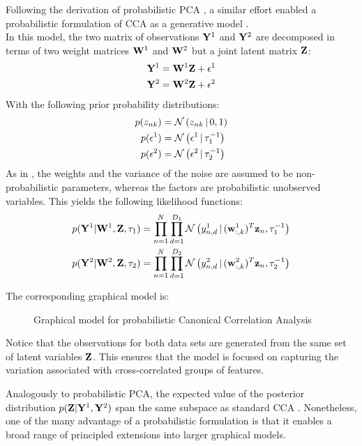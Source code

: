Following the derivation of probabilistic PCA \cite{Tipping1999}, a similar effort enabled a probabilistic formulation of CCA as a generative model \cite{Bach2005}.\\
In this model, the two matrix of observations ${\bf Y}^{1}$ and ${\bf Y}^{2}$ are decomposed in terms of two weight matrices ${\bf W}^{1}$ and ${\bf W}^{2}$ but a joint latent matrix ${\bf Z}$:
\begin{align*}
	{\bf Y}^{1} &= {\bf W}^{1} {\bf Z} + \epsilon^{1} \\
	{\bf Y}^{2} &= {\bf W}^{2} {\bf Z} + \epsilon^{2}
\end{align*}
With the following prior probability distributions:
\begin{align*}
	p(z_{nk}) &= \mathcal{N}\left(z_{nk} \,|\, 0,1\right) \\
	p(\epsilon^{1}) &= \mathcal{N}\left(\epsilon^{1} \,|\, \tau_{1}^{-1}\right) \\
	p(\epsilon^{2}) &= \mathcal{N}\left(\epsilon^{2} \,|\, \tau_{2}^{-1}\right)
\end{align*}
As in \cite{Tipping1999}, the weights and the variance of the noise are assumed to be non-probabilistic parameters, whereas the factors are probabilistic unobserved variables. This yields the following likelihood functions:
\begin{align} \label{eq:probabilistic_cca_likelihood}
	p({\bf Y}^{1}|{\bf W}^{1},{\bf Z},\tau_{1}) &= \prod_{n=1}^{N} \prod_{d=1}^{D_1} \mathcal{N}\left(y^{1}_{n,d} \,|\, ({\bf w}_{:,k}^{1})^T {\bf z}_{n},\tau_{1}^{-1}\right) \\
	p({\bf Y}^{2}|{\bf W}^{2},{\bf Z},\tau_{2}) &= \prod_{n=1}^{N} \prod_{d=1}^{D_2} \mathcal{N}\left(y^{2}_{n,d} \,|\, ({\bf w}_{:,k}^{2})^T {\bf z}_{n},\tau_{2}^{-1}\right) \nonumber
\end{align}

The corresponding graphical model is:
\begin{figure}[H] \begin{center}
	
	\label{fig:graphical_CCA}
	\caption{Graphical model for probabilistic Canonical Correlation Analysis}
\end{center} \end{figure}

Notice that the observations for both data sets are generated from the same set of latent variables ${\bf Z}$. This ensures that the model is focused on capturing the variation associated with cross-correlated groups of features.

Analogously to probabilistic PCA, the expected value of the posterior distribution $p({\bf Z}|{\bf Y}^{1},{\bf Y}^{2})$ span the same subspace as standard CCA \cite{Bach2005}. Nonetheless, one of the many advantage of a probabilistic formulation is that it enables a broad range of principled extensions into larger graphical models.


